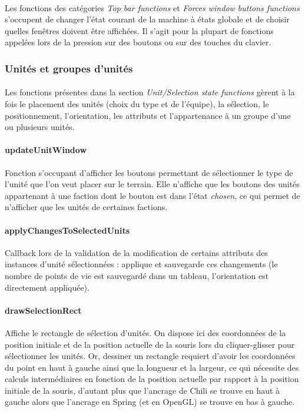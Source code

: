 \documentclass[a4paper]{article}
\begin{document}
\paragraph{}
Les fonctions des catégories \textit{Top bar functions} et \textit{Forces window buttons functions} s'occupent de changer l'état courant de la machine à états globale et de choisir quelles fenêtres doivent être affichées. Il s'agit pour la plupart de fonctions appelées lors de la pression sur des boutons ou sur des touches du clavier.
\subsubsection{Unités et groupes d'unités}
\paragraph{}
Les fonctions présentes dans la section \textit{Unit/Selection state functions} gèrent à la  fois le placement des unités (choix du type et de l'équipe), la sélection, le positionnement, l'orientation, les attributs et l'appartenance à un groupe d'une ou plusieurs unités.
\paragraph{updateUnitWindow} Fonction s'occupant d'afficher les boutons permettant de sélectionner le type de l'unité que l'on veut placer sur le terrain. Elle n'affiche que les boutons des unités appartenant à une faction dont le bouton est dans l'état \textit{chosen}, ce qui permet de n'afficher que les unités de certaines factions.
\paragraph{applyChangesToSelectedUnits} Callback lors de la validation de la modification de certains attributs des instances d'unité sélectionnées : applique et sauvegarde ces changements (le nombre de points de vie est sauvegardé dans un tableau, l'orientation est directement appliquée).
\paragraph{drawSelectionRect} Affiche le rectangle de sélection d'unités. On dispose ici des coordonnées de la position initiale et de la position actuelle de la souris lors du cliquer-glisser pour sélectionner les unités. Or, dessiner un rectangle requiert d'avoir les coordonnées du point en haut à gauche ainsi que la longueur et la largeur, ce qui nécessite des calculs intermédiaires en fonction de la position actuelle par rapport à la position initiale de la souris, d'autant plus que l'ancrage de Chili se trouve en haut à gauche alors que l'ancrage en Spring (et en OpenGL) se trouve en bas à gauche.
\end{document}
